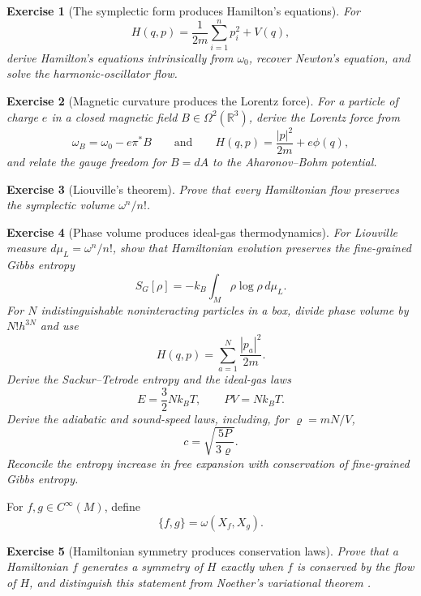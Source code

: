 \documentclass{article}
\newtheorem{exercise}{Exercise}
\begin{document}
\begin{exercise}[The symplectic form produces Hamilton's equations]\leavevmode\par
\textit{For}
\[
H(q,p)=\frac{1}{2m}\sum_{i=1}^np_i^2+V(q),
\]
\textit{derive Hamilton's equations intrinsically from $\omega_0$, recover
Newton's equation, and solve the harmonic-oscillator flow.}
\end{exercise}

\begin{exercise}[Magnetic curvature produces the Lorentz force]\leavevmode\par
\textit{For a particle of charge $e$ in a closed magnetic field
$B\in\Omega^2(\mathbb R^3)$, derive the Lorentz force from}
\[
\omega_B=\omega_0-e\pi^*B
\qquad\text{and}\qquad
H(q,p)=\frac{|p|^2}{2m}+e\phi(q),
\]
\textit{and relate the gauge freedom for $B=dA$ to the Aharonov--Bohm
potential.}
\end{exercise}

\begin{exercise}[Liouville's theorem]\leavevmode\par
\textit{Prove that every Hamiltonian flow preserves the symplectic volume
$\omega^n/n!$.}
\end{exercise}

\begin{exercise}[Phase volume produces ideal-gas thermodynamics]\leavevmode\par
\textit{For Liouville measure $d\mu_L=\omega^n/n!$, show that Hamiltonian
evolution preserves the fine-grained Gibbs entropy}
\[
S_G[\rho]
=-k_B\int_M\rho\log\rho\,d\mu_L.
\]
\textit{For $N$ indistinguishable noninteracting particles in a box, divide
phase volume by $N!h^{3N}$ and use}
\[
H(q,p)=\sum_{a=1}^N\frac{|p_a|^2}{2m}.
\]
\textit{Derive the Sackur--Tetrode entropy and the ideal-gas laws}
\[
E=\frac32Nk_BT,
\qquad
PV=Nk_BT.
\]
\textit{Derive the adiabatic and sound-speed laws, including, for
$\varrho=mN/V$,}
\[
c=\sqrt{\frac{5P}{3\varrho}}.
\]
\textit{Reconcile the entropy increase in free expansion with conservation
of fine-grained Gibbs entropy.}
\end{exercise}

For $f,g\in C^\infty(M)$, define
\[
\{f,g\}=\omega(X_f,X_g).
\]

\begin{exercise}[Hamiltonian symmetry produces conservation laws]\leavevmode\par
\textit{Prove that a Hamiltonian $f$ generates a symmetry of $H$ exactly
when $f$ is conserved by the flow of $H$, and distinguish this statement
from Noether's variational theorem \cite{noether}.}
\end{exercise}
\end{document}
